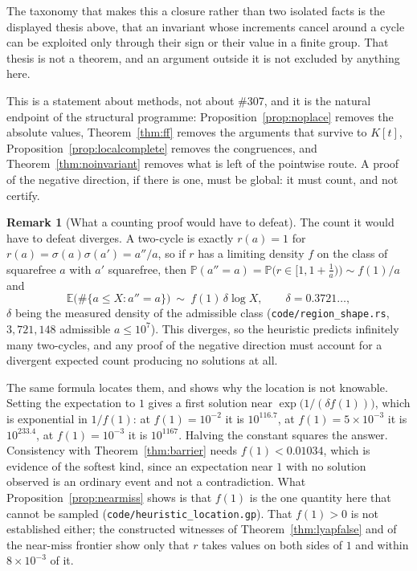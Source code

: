 \documentclass[11pt]{article}
\theoremstyle{definition}
\newtheorem{remark}[theorem]{Remark}
\begin{document}
The taxonomy that makes this a closure rather than two isolated facts is the displayed thesis above,
that an invariant whose increments cancel around a cycle can be exploited only through their sign or
their value in a finite group. That thesis is not a theorem, and an argument outside it is not
excluded by anything here.

This is a statement about methods, not about \#307, and it is the natural endpoint of the structural
programme: Proposition~\ref{prop:noplace} removes the absolute values, Theorem~\ref{thm:ff} removes
the arguments that survive to $K[t]$, Proposition~\ref{prop:localcomplete} removes the congruences,
and Theorem~\ref{thm:noinvariant} removes what is left of the pointwise route. A proof of the
negative direction, if there is one, must be global: it must count, and not certify.

\begin{remark}[What a counting proof would have to defeat]\label{rem:whatcounting}
The count it would have to defeat diverges. A two-cycle is exactly $r(a)=1$ for
$r(a)=\sigma(a)\sigma(a')=a''/a$, so if $r$ has a limiting density $f$ on the class of squarefree $a$
with $a'$ squarefree, then $\mathbb{P}(a''=a)=\mathbb{P}\bigl(r\in[1,1+\tfrac1a)\bigr)\sim f(1)/a$ and
\[ \mathbb{E}\bigl(\#\{a\le X:a''=a\}\bigr)\ \sim\ f(1)\,\delta\log X,\qquad \delta=0.3721\ldots, \]
$\delta$ being the measured density of the admissible class \textup{(\texttt{code/region\_shape.rs},
$3{,}721{,}148$ admissible $a\le10^7$)}. This diverges, so the heuristic predicts infinitely many
two-cycles, and any proof of the negative direction must account for a divergent expected count
producing no solutions at all.

The same formula locates them, and shows why the location is not knowable. Setting the expectation to
$1$ gives a first solution near $\exp\bigl(1/(\delta f(1))\bigr)$, which is exponential in $1/f(1)$:
at $f(1)=10^{-2}$ it is $10^{116.7}$, at $f(1)=5\times10^{-3}$ it is $10^{233.4}$, at $f(1)=10^{-3}$
it is $10^{1167}$. Halving the constant squares the answer. Consistency with
Theorem~\ref{thm:barrier} needs $f(1)<0.01034$, which is evidence of the softest kind, since an
expectation near $1$ with no solution observed is an ordinary event and not a contradiction. What
Proposition~\ref{prop:nearmiss} shows is that $f(1)$ is the one quantity here that cannot be sampled
\textup{(\texttt{code/heuristic\_location.gp})}. That $f(1)>0$ is not established either; the
constructed witnesses of Theorem~\ref{thm:lyapfalse} and of the near-miss frontier show only that $r$
takes values on both sides of $1$ and within $8\times10^{-3}$ of it.
\end{remark}
\end{document}
